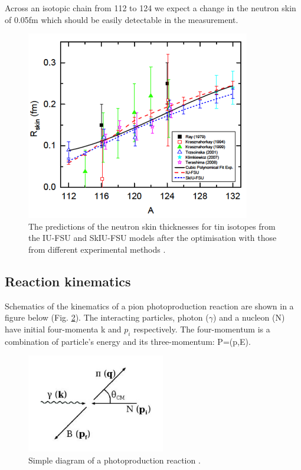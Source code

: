 \indent Across an isotopic chain from 112 to 124 we expect a change in the neutron skin of 0.05fm which should be easily detectable in the measurement.

\begin{figure}[H]
\begin{center}
\includegraphics[scale=0.6]{pictures/png/tiniso.png}
\caption{The predictions of the neutron skin thicknesses for tin isotopes from the IU-FSU and SkIU-FSU models after the optimisation with those from different experimental methods \cite{fattoyev}.}
\label{tiniso}
\end{center}
\end{figure}

\subsection{Reaction kinematics}

\indent Schematics of the kinematics of a pion photoproduction reaction are shown in a figure below (Fig. \ref{photorea}). The interacting particles, photon ($\gamma$) and a nucleon (N) have initial four-momenta k and $p_{i}$ respectively. The four-momentum is a combination of particle's energy and its three-momentum: P=(p,E).

\begin{figure}[H]
\begin{center}
\includegraphics[scale=0.6]{pictures/png/photorea.png}
\caption{Simple diagram of a photoproduction reaction \cite{jo}.}
\label{photorea}
\end{center}
\end{figure}

